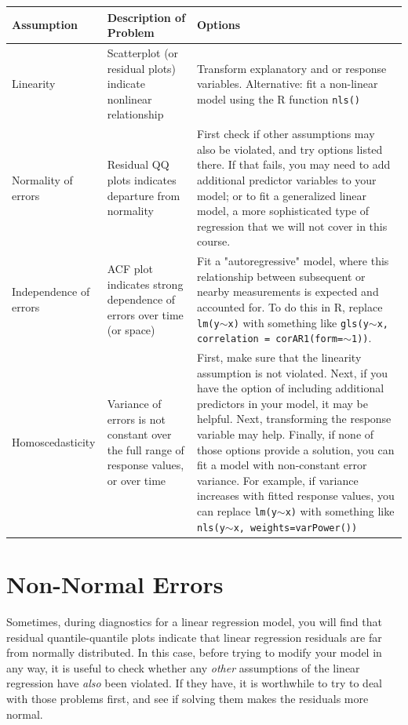 \documentclass[twoside]{book}\usepackage[]{graphicx}\usepackage[]{xcolor}
\newcounter{example}[section]
\begin{document}
\begin{center}
  	\begin{tabular}{p{1.5in}|p{2in}|p{2.5in}}
			\hline
			Assumption & Description of Problem & Options \\
			 \hline
			Linearity & Scatterplot (or residual plots) indicate nonlinear relationship & Transform explanatory and or response variables. Alternative: fit a non-linear model using the R function \texttt{nls()} \\
			Normality of errors & Residual QQ plots indicates departure from normality & First check if other assumptions may also be violated, and try options listed there. If that fails, you may need to add additional predictor variables to your model; or to fit a generalized linear model, a more sophisticated type of regression that we will not cover in this course. \\
			Independence of errors & ACF plot indicates strong dependence of errors over time (or space) & Fit a "autoregressive" model, where this relationship between subsequent or nearby measurements is expected and accounted for.  To do this in R, replace \texttt{lm(y$\sim$x)} with something like \texttt{gls(y$\sim$x, correlation = corAR1(form=$\sim$1))}.  \\
      Homoscedasticity & Variance of errors is not constant over the full range of response values, or over time & First, make sure that the linearity assumption is not violated. Next, if you have the option of including additional predictors in your model, it may be helpful.  Next, transforming the response variable may help. Finally, if none of those options provide a solution, you can fit a model with non-constant error variance. For example, if variance increases with fitted response values, you can replace \texttt{lm(y$\sim$x)} with something like \texttt{nls(y$\sim$x, weights=varPower())}\\ 
			\hline
	\end{tabular}
	\end{center}
\section{Non-Normal Errors}
Sometimes, during diagnostics for a linear regression model, you will find that residual quantile-quantile plots indicate that linear regression residuals are far from normally distributed.  In this case, before trying to modify your model in any way, it is useful to check whether any \emph{other} assumptions of the linear regression have \emph{also} been violated.  If they have, it is worthwhile to try to deal with those problems first, and see if solving them makes the residuals more normal.
\end{document}
